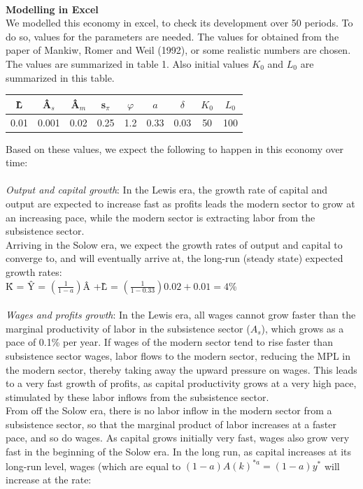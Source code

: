 \documentclass{article}
\begin{document}
\\
\textbf {Modelling in Excel} \\
We modelled this economy in excel, to check its development over 50 periods. To do so, values for the parameters are needed. The values for obtained from the paper of Mankiw, Romer and Weil (1992), or some realistic numbers are chosen. The values are summarized in table 1. Also initial values $K_0$ and $L_0$ are summarized in this table. \\
\begin{center}
\begin{tabular}{c|c|c|c|c|c|c|c|c}
{\^L} 		& {\^A}$_s$		& {\^A}$_m$ 	& s$_\pi$	& $\varphi$	& $a$	& $\delta$	& $K_0$	& $L_0$		\\
 \hline
0.01		& 0.001		& 0.02		& 0.25	& 1.2		& 0.33 & 0.03	& 50		& 100
\end{tabular}
\end{center}
Based on these values, we expect the following to happen in this economy over time: \\
\\
\textit {Output and capital growth}: In the Lewis era, the growth rate of capital and output are expected to
increase fast as profits leads the modern sector to grow at an increasing pace, while the modern sector is extracting labor from the subsistence sector.\\
Arriving in the Solow era, we expect the growth rates of output and capital to converge to, and will eventually arrive at, the long-run (steady state) expected growth rates: \\
{\^K} = {\^Y} = $(\frac{1}{1-a})${\^A} +{\^L} = $(\frac{1}{1-0.33})0.02 +0.01 = 4$\% \\
\\
\textit {Wages and profits growth}: In the Lewis era, all wages cannot grow faster than the marginal productivity of labor in the subsistence sector ($A_s$), which grows as a pace of 0.1\% per year. If wages of the modern sector tend to rise faster than subsistence sector wages, labor flows to the modern sector, reducing the MPL in the modern sector, thereby taking away the upward pressure on wages. This leads to a very fast growth of profits, as capital productivity grows at a very high pace, stimulated by these labor inflows from the subsistence sector.\\
From off the Solow era, there is no labor inflow in the modern sector from a subsistence sector, so that the marginal product of labor increases at a faster pace, and so do wages. As capital grows initially very fast, wages also grow very fast in the beginning of the Solow era. In the long run, as capital increases at its long-run level, wages (which are equal to $(1-a)A(k)^{{\ast}a} =(1-a)y^{\ast}$ will increase at the rate:\\
\end{document}
